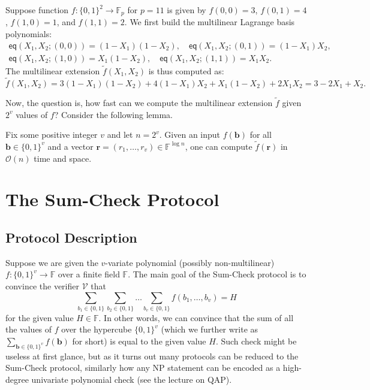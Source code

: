 \documentclass{gkr-template}
\begin{document}
\begin{example}\label{example:mle}
    Suppose function $f: \{0,1\}^2 \to \mathbb{F}_p$ for $p=11$ is given by
    $f(0,0)=3$, $f(0,1)=4$, $f(1,0)=1$, and $f(1,1)=2$. We first build the
    multilinear Lagrange basis polynomials:
    \vspace{-7.5px}
    \begin{gather*}
        \mathsf{eq}(X_1,X_2;(0,0)) = (1-X_1)(1-X_2), \quad
        \mathsf{eq}(X_1,X_2;(0,1)) = (1-X_1)X_2, \\
        \mathsf{eq}(X_1,X_2;(1,0)) = X_1(1-X_2), \quad
        \mathsf{eq}(X_1,X_2;(1,1)) = X_1X_2.
    \end{gather*}
    The multilinear extension $\widetilde{f}(X_1,X_2)$ is thus computed as:
    \vspace{-7.5px}
    \begin{equation*}
        \widetilde{f}(X_1,X_2) = 3(1-X_1)(1-X_2) + 4(1-X_1)X_2 + X_1(1-X_2) + 2X_1X_2 = 3 - 2X_1 + X_2.
    \end{equation*}
\end{example}

Now, the question is, how fast can we compute the multilinear extension
$\widetilde{f}$ given $2^v$ values of $f$? Consider the following lemma.

\begin{lemma}\label{lemma:multilinear-extension-computation}
    Fix some positive integer $v$ and let $n=2^v$. Given an input
    $f(\boldsymbol{b})$ for all $\boldsymbol{b} \in \{0,1\}^v$ and a vector
    $\boldsymbol{r}=(r_1,\dots,r_v) \in \mathbb{F}^{\log n}$, one can compute
    $\widetilde{f}(\mathbf{r})$ in $\mathcal{O}(n)$ time and space.
\end{lemma}

\section*{The Sum-Check Protocol}

\subsection*{Protocol Description}

Suppose we are given the $v$-variate polynomial (possibly non-multilinear) $f:
\{0,1\}^v \to \mathbb{F}$ over a finite field $\mathbb{F}$. The main goal 
of the Sum-Check protocol is to convince the verifier $\mathcal{V}$ that
\begin{equation*}
    \sum_{b_1 \in \{0,1\}}\sum_{b_2 \in \{0,1\}} \dots \sum_{b_v \in \{0,1\}} f(b_1,\dots,b_v) = H
\end{equation*}
for the given value $H \in \mathbb{F}$. In other words, we can convince that the
sum of all the values of $f$ over the hypercube $\{0,1\}^v$ (which we further
write as $\sum_{\boldsymbol{b} \in \{0,1\}^v}f(\boldsymbol{b})$ for short) is
equal to the given value $H$. Such check might be useless at first glance, but
as it turns out many protocols can be reduced to the Sum-Check protocol,
similarly how any NP statement can be encoded as a high-degree univariate
polynomial check (see the lecture on QAP).
\end{document}
